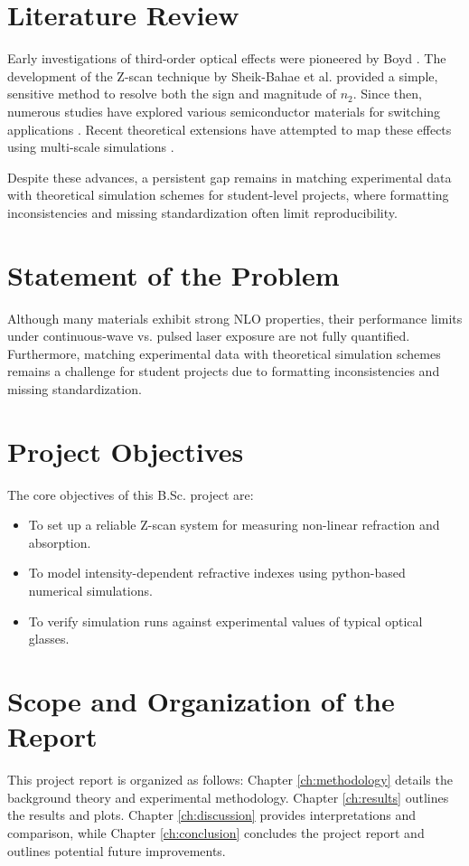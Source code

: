 \section{Literature Review}
Early investigations of third-order optical effects were pioneered by Boyd \cite{boyd2020nonlinear}. The development of the Z-scan technique by Sheik-Bahae et al. \cite{sheik1990sensitive} provided a simple, sensitive method to resolve both the sign and magnitude of $n_2$. Since then, numerous studies have explored various semiconductor materials for switching applications \cite{sutherland2003handbook}. Recent theoretical extensions have attempted to map these effects using multi-scale simulations \cite{yamada2018numerical}.

Despite these advances, a persistent gap remains in matching experimental data with theoretical simulation schemes for student-level projects, where formatting inconsistencies and missing standardization often limit reproducibility.

\section{Statement of the Problem}
Although many materials exhibit strong NLO properties, their performance limits under continuous-wave vs. pulsed laser exposure are not fully quantified. Furthermore, matching experimental data with theoretical simulation schemes remains a challenge for student projects due to formatting inconsistencies and missing standardization.

\section{Project Objectives}
The core objectives of this B.Sc. project are:
\begin{itemize}
    \item To set up a reliable Z-scan system for measuring non-linear refraction and absorption.
    \item To model intensity-dependent refractive indexes using python-based numerical simulations.
    \item To verify simulation runs against experimental values of typical optical glasses.
\end{itemize}

\section{Scope and Organization of the Report}
This project report is organized as follows: Chapter \ref{ch:methodology} details the background theory and experimental methodology. Chapter \ref{ch:results} outlines the results and plots. Chapter \ref{ch:discussion} provides interpretations and comparison, while Chapter \ref{ch:conclusion} concludes the project report and outlines potential future improvements.
